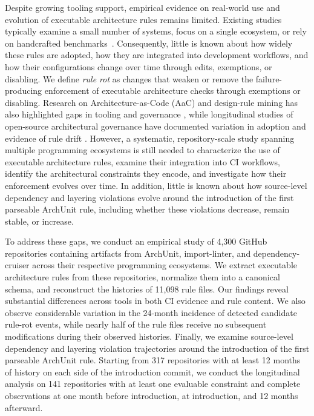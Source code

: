Despite growing tooling support, empirical 
evidence on real-world
use and evolution of executable architecture 
rules remains limited.
Existing studies typically examine a small 
number of systems, focus on
a single ecosystem, or rely on handcrafted 
benchmarks~\cite{pinto2017,mujahid2024}.
Consequently, little is known about how 
widely these rules are adopted,
how they are integrated into development
workflows, and how their
configurations change over time through edits, 
exemptions, or disabling.
We define \emph{rule rot} as changes that weaken or 
remove the failure-producing enforcement of executable 
architecture checks through exemptions or disabling.
Research on Architecture-as-Code (AaC) and design-rule 
mining has also highlighted gaps in tooling and governance 
\cite{pontillo2026icsa,lucena2026ecsa}, while longitudinal 
studies of open-source architectural governance have 
documented variation in adoption and evidence of rule 
drift \cite{larsen2026seaa}. 
However, a systematic, repository-scale study spanning 
multiple programming ecosystems is still needed to 
characterize the use of executable architecture rules, 
examine their integration into CI workflows, identify 
the architectural constraints they encode, and investigate 
how their enforcement evolves over time. In addition, 
little is known about how source-level dependency and 
layering violations evolve around the introduction of the 
first parseable ArchUnit rule, including whether these 
violations decrease, remain stable, or increase.

To address these gaps, we conduct an empirical study of 
4,300 GitHub repositories containing artifacts from 
ArchUnit, import-linter, and dependency-cruiser across 
their respective programming ecosystems. We extract 
executable architecture rules from these repositories, 
normalize them into a canonical schema, and reconstruct 
the histories of 11,098 rule files. Our findings reveal 
substantial differences across tools in both CI evidence 
and rule content. We also observe considerable variation 
in the 24-month incidence of detected candidate rule-rot 
events, while nearly half of the rule files receive no 
subsequent modifications during their observed histories. 
Finally, we examine source-level dependency and layering 
violation trajectories around the introduction of the 
first parseable ArchUnit rule. Starting from 317 
repositories with at least 12 months of history on each 
side of the introduction commit, we conduct the 
longitudinal analysis on 141 repositories with at 
least one evaluable constraint and complete observations 
at one month before introduction, at introduction, 
and 12 months afterward.

